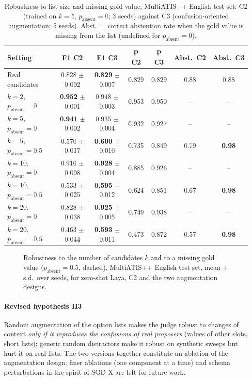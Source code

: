 \begin{table}[pos=t]
\centering
\small
\caption{Robustness to list size and missing gold value, MultiATIS++ English test set: C2 (trained on $k=5$, $p_{\text{absent}}=0$; 3 seeds) against C3 (confusion-oriented augmentation; 5 seeds). Abst.\ = correct abstention rate when the gold value is missing from the list (undefined for $p_{\text{absent}}=0$).}
\label{tab:rq5}
\begin{tabular}{@{}lcccccc@{}}
\toprule
Setting & F1 C2 & F1 C3 & P C2 & P C3 & Abst.\ C2 & Abst.\ C3 \\
\midrule
Real candidates & 0.828 $\pm$ 0.002 & \textbf{0.829} $\pm$ 0.007 & 0.829 & 0.829 & 0.88 & 0.88 \\
$k=2$, $p_{\text{absent}}=0$ & \textbf{0.952} $\pm$ 0.001 & 0.948 $\pm$ 0.003 & 0.953 & 0.950 & -- & -- \\
$k=5$, $p_{\text{absent}}=0$ & \textbf{0.941} $\pm$ 0.002 & 0.935 $\pm$ 0.004 & 0.932 & 0.927 & -- & -- \\
$k=5$, $p_{\text{absent}}=0.5$ & 0.570 $\pm$ 0.017 & \textbf{0.600} $\pm$ 0.010 & 0.735 & 0.849 & 0.79 & \textbf{0.98} \\
$k=10$, $p_{\text{absent}}=0$ & 0.916 $\pm$ 0.008 & \textbf{0.928} $\pm$ 0.004 & 0.885 & 0.926 & -- & -- \\
$k=10$, $p_{\text{absent}}=0.5$ & 0.533 $\pm$ 0.025 & \textbf{0.595} $\pm$ 0.012 & 0.624 & 0.851 & 0.67 & \textbf{0.98} \\
$k=20$, $p_{\text{absent}}=0$ & 0.828 $\pm$ 0.038 & \textbf{0.925} $\pm$ 0.005 & 0.749 & 0.938 & -- & -- \\
$k=20$, $p_{\text{absent}}=0.5$ & 0.463 $\pm$ 0.044 & \textbf{0.593} $\pm$ 0.011 & 0.473 & 0.872 & 0.57 & \textbf{0.98} \\
\bottomrule
\end{tabular}
\end{table}

\begin{figure}[pos=t]
\centering
{}
\caption{Robustness to the number of candidates $k$ and to a missing gold value ($p_{\text{absent}}=0.5$, dashed), MultiATIS++ English test set, mean $\pm$ s.d.\ over seeds, for zero-shot Laya, C2 and the two augmentation designs.}
\label{fig:sweep}
\end{figure}

\paragraph{Revised hypothesis H3} Random augmentation of the option lists makes the judge robust to changes of context \emph{only if it reproduces the confusions of real proposers} (values of other slots, short lists); generic random distractors make it robust on synthetic sweeps but hurt it on real lists. The two versions together constitute an ablation of the augmentation design; finer ablations (one component at a time) and schema perturbations in the spirit of SGD-X are left for future work.
